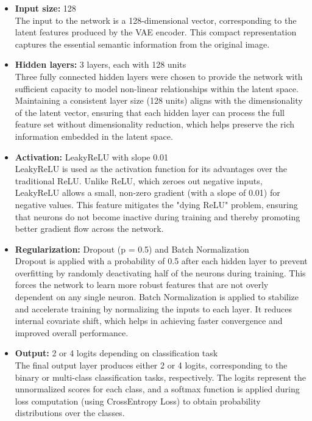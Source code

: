 \begin{itemize}
    \item \textbf{Input size:} 128 \\
    The input to the network is a 128-dimensional vector, corresponding to the latent features produced by the VAE encoder. This compact representation captures the essential semantic information from the original image.
    
    \item \textbf{Hidden layers:} 3 layers, each with 128 units \\
    Three fully connected hidden layers were chosen to provide the network with sufficient capacity to model non-linear relationships within the latent space. Maintaining a consistent layer size (128 units) aligns with the dimensionality of the latent vector, ensuring that each hidden layer can process the full feature set without dimensionality reduction, which helps preserve the rich information embedded in the latent space.
    
    \item \textbf{Activation:} LeakyReLU with slope 0.01 \\
    LeakyReLU is used as the activation function for its advantages over the traditional ReLU. Unlike ReLU, which zeroes out negative inputs, LeakyReLU allows a small, non-zero gradient (with a slope of 0.01) for negative values. This feature mitigates the "dying ReLU" problem, ensuring that neurons do not become inactive during training and thereby promoting better gradient flow across the network.
    
    \item \textbf{Regularization:} Dropout (p = 0.5) and Batch Normalization \\
    Dropout is applied with a probability of 0.5 after each hidden layer to prevent overfitting by randomly deactivating half of the neurons during training. This forces the network to learn more robust features that are not overly dependent on any single neuron. Batch Normalization is applied to stabilize and accelerate training by normalizing the inputs to each layer. It reduces internal covariate shift, which helps in achieving faster convergence and improved overall performance.
    
    \item \textbf{Output:} 2 or 4 logits depending on classification task \\
    The final output layer produces either 2 or 4 logits, corresponding to the binary or multi-class classification tasks, respectively. The logits represent the unnormalized scores for each class, and a softmax function is applied during loss computation (using CrossEntropy Loss) to obtain probability distributions over the classes.
\end{itemize}

